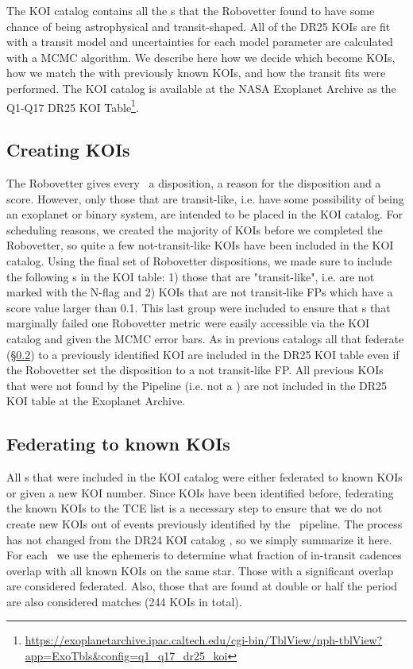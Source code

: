 The KOI catalog contains all the \opstce s that the Robovetter found to have some chance of being astrophysical and transit-shaped. All of the DR25 KOIs are fit with a transit model and uncertainties for each model parameter are calculated with a MCMC algorithm.  We describe here how we decide which  become KOIs, how we match the  with previously known KOIs, and how the transit fits were performed. The KOI catalog is available at the NASA Exoplanet Archive as the Q1-Q17 DR25 KOI Table\footnote{\url{https://exoplanetarchive.ipac.caltech.edu/cgi-bin/TblView/nph-tblView?app=ExoTbls\&config=q1\_q17\_dr25\_koi}}.
\label{koisec}

\subsection{Creating KOIs}
The Robovetter gives every \opstce\ a disposition, a reason for the disposition and a score.  However, only those that are transit-like, i.e. have some possibility of being an exoplanet or binary system, are intended to be placed in the KOI catalog. For scheduling reasons, we created the majority of KOIs before we completed the Robovetter, so quite a few not-transit-like KOIs have been included in the KOI catalog. Using the final set of Robovetter dispositions, we made sure to include the following \opstce s in the KOI table: 1) those that are "transit-like", i.e. are not marked with the N-flag and 2) KOIs that are not transit-like FPs which have a score value larger than 0.1.  This last group were included to ensure that \opstce s that marginally failed one Robovetter metric were easily accessible via the KOI catalog and given the MCMC error bars. As in previous catalogs all  that federate (\S\ref{s:federation}) to a previously identified KOI are included in the DR25 KOI table even if the Robovetter set the disposition to a not transit-like FP. All previous KOIs that were not found by the \Kepler{} Pipeline (i.e. not a \opstce{}) are not included in the DR25 KOI table at the Exoplanet Archive.


\subsection{Federating to known KOIs}
\label{s:federation}
All \opstce s that were included in the KOI catalog were either federated to known KOIs or given a new KOI number. Since KOIs have been identified before, federating the known KOIs to the TCE list is a necessary step to ensure that we do not create new KOIs out of events previously identified by the \Kepler\ pipeline.  The process has not changed from the  DR24 KOI catalog \citep{Coughlin2016}, so we simply summarize it here.  For each \opstce\ we use the ephemeris to determine what fraction of in-transit cadences overlap with all known KOIs on the same star.  Those with a significant overlap are considered federated.  Also, those that are found at double or half the period are also considered matches (244 KOIs in total).  


